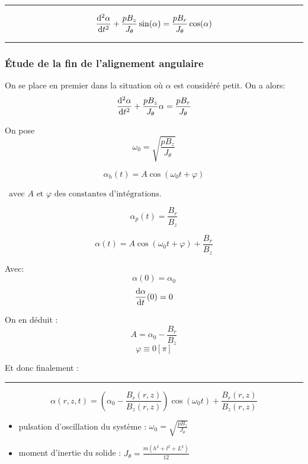 \rule{\textwidth}{0.4pt}
\begin{center}
$$\frac{\mathrm{d^2}\alpha}{\mathrm{d}t^2} + \frac{pB_z}{J_\theta}\sin(\alpha) = \frac{pB_r}{J_\theta} \cos(\alpha)$$    
\end{center}

\rule{\textwidth}{0.4pt}

\subsubsection{Étude de la fin de l'alignement angulaire}
On se place en premier dans la situation où $\alpha$ est considéré petit. On a alors:
$$\frac{\mathrm{d^2}\alpha}{\mathrm{d}t^2} + \frac{pB_z}{J_\theta}\alpha = \frac{pB_r}{J_\theta} $$

On pose $$\omega_0 = \sqrt{\frac{pB_z}{J_\theta}}$$


$$\alpha_h(t) = A \cos(\omega_0 t + \varphi)$$

$\, \text{ avec } A \text{ et } \varphi \text{ des constantes d'intégrations}$.


$$\alpha_p(t) = \frac{B_r}{B_z}$$



$$\alpha(t) = A \cos(\omega_0 t + \varphi) + \frac{B_r}{B_z}$$


Avec:
$$\alpha(0) = \alpha_0$$
$$\frac{\mathrm{d}\alpha}{\mathrm{d}t} (0) = 0$$

On en déduit : 
$$A = \alpha_0  - \frac{B_r}{B_z}$$
$$\varphi \equiv 0 \left[\pi\right] $$ 

Et donc finalement :\newpage

\rule{\textwidth}{0.4pt}
\begin{center}
    $$\alpha(r,z,t) = \left(\alpha_0  - \frac{B_r(r,z)}{B_z(r,z)}\right) \cos(\omega_0 t) + \frac{B_r(r,z)}{B_z(r,z)}$$    

\begin{itemize}
    \item pulsation d'oscillation du système : $\omega_0 = \sqrt{\frac{pB_z}{J_\theta}}$
    \item moment d'inertie du solide : $J_\theta = \frac{m(h^2+l^2+L^2)}{12}$
\end{itemize}
\end{center}

